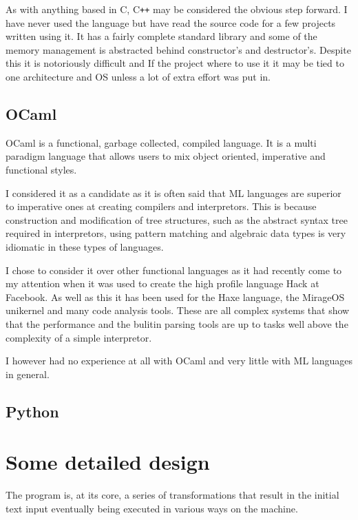 As with anything based in C, C\verb!++! may be considered the obvious step forward.
I have never used the language but have read the source code for a few projects written using it.
It has a fairly complete standard library and some of the memory management is abstracted behind constructor's and destructor's.
Despite this it is notoriously difficult and If the project where to use it it may be tied to one architecture and OS unless a lot of extra effort was put in.

\subsection{OCaml}
OCaml is a functional, garbage collected, compiled language.
It is a multi paradigm language that allows users to mix object oriented, imperative and functional styles.

I considered it as a candidate as it is often said that ML languages are superior to imperative ones at creating compilers and interpretors. 
This is because construction and modification of tree structures, such as the abstract syntax tree required in interpretors, using pattern matching and algebraic data types is very idiomatic in these types of languages.

I chose to consider it over other functional languages as it had recently come to my attention when it was used to create the high profile language Hack at Facebook.
As well as this it has been used for the Haxe language, the MirageOS unikernel and many code analysis tools.
These are all complex systems that show that the performance and the bulitin parsing tools are up to tasks well above the complexity of a simple interpretor.

I however had no experience at all with OCaml and very little with ML languages in general.



\subsection{Python}



\section{Some detailed design}
The program is, at its core, a series of transformations that result in the initial text input eventually being executed in various ways on the machine.

